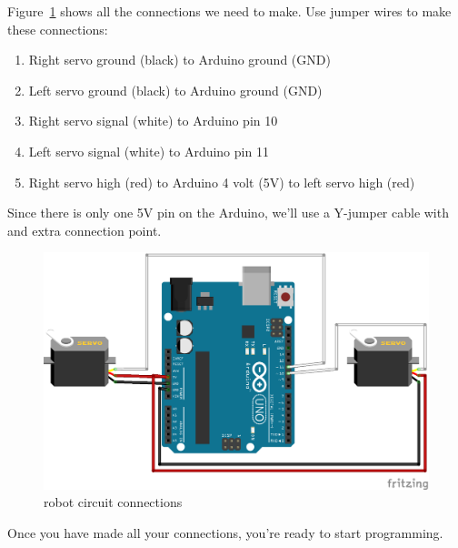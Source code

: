 \documentclass[letterpaper]{article}
\begin{document}
Figure~\ref{fig:circuit} shows all the connections we need to make.
Use jumper wires to make these connections:
\begin{enumerate}
    \item Right servo ground (black) to Arduino ground (GND)
    \item Left servo ground (black) to Arduino ground (GND)
    \item Right servo signal (white) to Arduino pin 10
    \item Left servo signal (white) to Arduino pin 11
    \item Right servo high (red) to Arduino 4 volt (5V) to left servo high (red)
\end{enumerate}
Since there is only one 5V pin on the Arduino,
we'll use a Y-jumper cable with and extra connection point.

\begin{figure}[h!]
    \centering
    \includegraphics[width=\textwidth]{wiring.png}
    \caption{robot circuit connections}
    \label{fig:circuit}
\end{figure}

Once you have made all your connections, you're ready to start programming.


\clearpage


\end{document}
